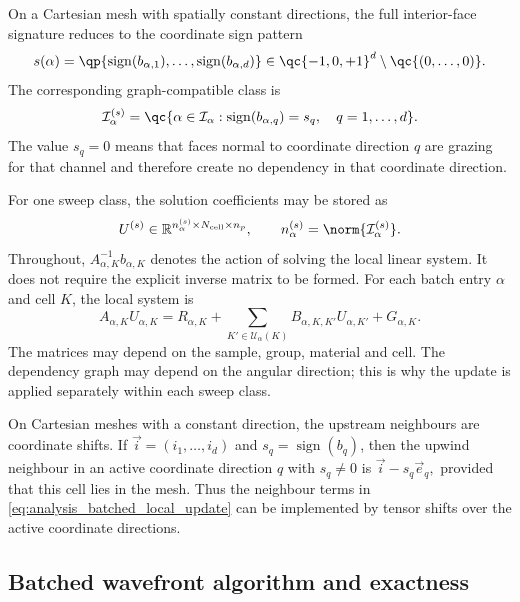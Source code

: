 \documentclass[final]{amsart}
\begin{document}
On a Cartesian mesh with spatially constant directions, the full
interior-face signature reduces to the coordinate sign pattern
\begin{equation}
  s(\alpha)
  =
  \qp{
    \operatorname{sign}(b_{\alpha,1}),
    \ldots,
    \operatorname{sign}(b_{\alpha,d})
  }
  \in
  \qc{-1,0,+1}^d
  \setminus\qc{(0,\ldots,0)}.
\end{equation}
The corresponding graph-compatible class is
\begin{equation}
  \mathcal{I}^{(s)}_\alpha
  =
  \qc{
    \alpha\in\mathcal{I}_\alpha:
    \operatorname{sign}(b_{\alpha,q})=s_q,
    \quad q=1,\ldots,d
  }.
\end{equation}
The value $s_q=0$ means that faces normal to coordinate direction $q$
are grazing for that channel and therefore create no dependency in
that coordinate direction.

For one sweep class, the solution coefficients may be stored as
\begin{equation}
U^{(s)}
\in
\mathbb{R}^{n_\alpha^{(s)}\times N_{\mathrm{cell}}\times n_p},
\qquad
n_\alpha^{(s)}=\norm{\mathcal{I}_\alpha^{(s)}}.
\label{eq:analysis_flat_solution_tensor}
\end{equation}
Throughout, $A_{\alpha,K}^{-1}b_{\alpha,K}$ denotes the action of
solving the local linear system. It does not require the explicit
inverse matrix to be formed. For each batch entry $\alpha$ and cell $K$, the local system is
\begin{equation}
A_{\alpha,K}U_{\alpha,K}
=
R_{\alpha,K}
+
\sum_{K'\in\mathcal U_\alpha(K)}
B_{\alpha,K,K'}U_{\alpha,K'}
+
G_{\alpha,K}.
\label{eq:analysis_batched_local_update}
\end{equation}
The matrices may depend on the sample, group, material and cell. The
dependency graph may depend on the angular direction; this is why the
update is applied separately within each sweep class.

On Cartesian meshes with a constant direction, the upstream neighbours
are coordinate shifts. If $\vec i=(i_1,\dots,i_d)$ and
$s_q=\operatorname{sign}(b_q)$, then the upwind neighbour in an active
coordinate direction $q$ with $s_q\neq0$ is $\vec i-s_q\vec e_q,$
provided that this cell lies in the mesh. Thus the neighbour terms in
\eqref{eq:analysis_batched_local_update} can be implemented by tensor
shifts over the active coordinate directions.

\subsection{Batched wavefront algorithm and exactness}
\end{document}
